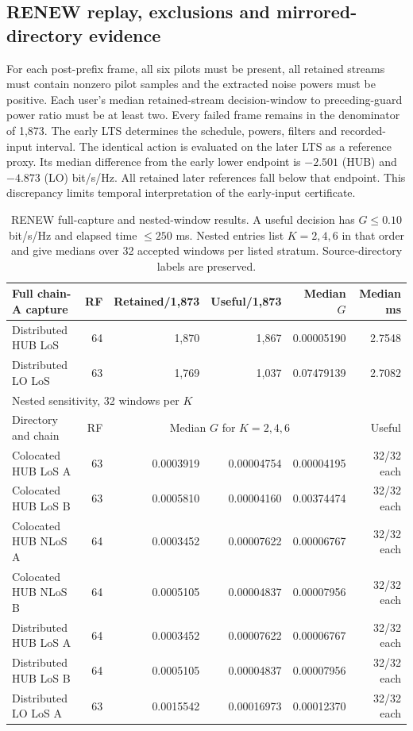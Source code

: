 \clearpage
\subsection*{RENEW replay, exclusions and mirrored-directory evidence}
For each post-prefix frame, all six pilots must be present, all retained
streams must contain nonzero pilot samples and the extracted noise powers
must be positive. Each user's median retained-stream decision-window to
preceding-guard power ratio must be at least two. Every failed frame remains
in the denominator of 1,873. The early LTS determines the schedule, powers,
filters and recorded-input interval. The identical action is evaluated on
the later LTS as a reference proxy. Its median difference from the early
lower endpoint is $-2.501$ (HUB) and $-4.873$ (LO) bit/s/Hz. All retained
later references fall below that endpoint. This discrepancy limits temporal
interpretation of the early-input certificate.

\begin{table}[htbp]
\centering\small
\caption{RENEW full-capture and nested-window results. A useful decision has
$G\leq0.10$ bit/s/Hz and elapsed time $\leq250$ ms. Nested entries list
$K=2,4,6$ in that order and give medians over 32 accepted windows per listed
stratum. Source-directory labels are preserved.}
\label{supp:table8}
\begin{tabular}{lrrrrr}
\hline
Full chain-A capture & RF & Retained/1,873 & Useful/1,873 & Median $G$ & Median ms\\
\hline
Distributed HUB LoS &64&1,870&1,867&0.00005190&2.7548\\
Distributed LO LoS &63&1,769&1,037&0.07479139&2.7082\\
\hline
\multicolumn{6}{l}{Nested sensitivity, 32 windows per $K$}\\
Directory and chain & RF & \multicolumn{3}{c}{Median $G$ for $K=2,4,6$} & Useful\\
\hline
Colocated HUB LoS A &63&0.0003919&0.00004754&0.00004195&32/32 each\\
Colocated HUB LoS B &63&0.0005810&0.00004160&0.00374474&32/32 each\\
Colocated HUB NLoS A &64&0.0003452&0.00007622&0.00006767&32/32 each\\
Colocated HUB NLoS B &64&0.0005105&0.00004837&0.00007956&32/32 each\\
Distributed HUB LoS A &64&0.0003452&0.00007622&0.00006767&32/32 each\\
Distributed HUB LoS B &64&0.0005105&0.00004837&0.00007956&32/32 each\\
Distributed LO LoS A &63&0.0015542&0.00016973&0.00012370&32/32 each\\
\hline
\end{tabular}
\end{table}
